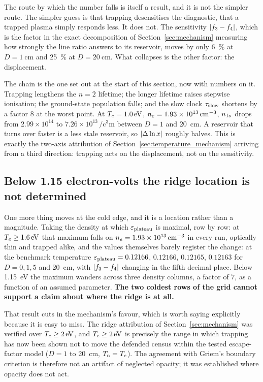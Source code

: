 The route by which the number falls is itself a result, and it is not the
simpler route. The simpler guess is that trapping desensitises the diagnostic,
that a trapped plasma simply responds less. It does not. The sensitivity
$|f_{3}-f_{4}|$, which is the factor in the exact decomposition of
Section~\ref{sec:mechanism} measuring how strongly the line ratio answers to its
reservoir, moves by only \SI{6}{\percent} at $D = \SI{1}{\centi\metre}$ and
\SI{25}{\percent} at $D = \SI{20}{\centi\metre}$. What collapses is the other
factor: the displacement.

The chain is the one set out at the start of this section, now with numbers on
it. Trapping lengthens the $n=2$ lifetime; the longer lifetime raises stepwise
ionisation; the ground-state population falls; and the slow clock $\tau_{\mathrm{slow}}$
shortens by a factor $8$ at the worst point. At $T_e = \SI{1.0}{\electronvolt}$,
$n_e = 1.93\times10^{13}\,\si{\per\cubic\centi\metre}$, $n_{1s}$ drops from
$2.99\times10^{14}$ to $7.26\times10^{13}\,\si{\per\cubic\centi\metre}$ between
$D = 1$ and \SI{20}{\centi\metre}. A reservoir that turns over faster is a less
stale reservoir, so $|\Delta\ln x|$ roughly halves. This is exactly the
two-axis attribution of Section~\ref{sec:temperature_mechanism} arriving from a
third direction: trapping acts on the displacement, not on the sensitivity.

\subsection{Below 1.15 electron-volts the ridge location is not determined}

One more thing moves at the cold edge, and it is a location rather than a
magnitude. Taking the density at which $\varepsilon_{\mathrm{plateau}}$ is maximal, row by row: at
$T_e \ge \SI{1.6}{\electronvolt}$ that maximum falls on
$n_e = 1.93\times10^{13}\,\si{\per\cubic\centi\metre}$ in every run, optically
thin and trapped alike, and the values themselves barely register the change:
at the benchmark temperature $\varepsilon_{\mathrm{plateau}} = 0.12166$, $0.12166$, $0.12165$,
$0.12163$ for $D = 0, 1, 5$ and \SI{20}{\centi\metre}, with
$|f_{3}-f_{4}|$ changing in the fifth decimal place. Below
\SI{1.15}{\electronvolt} the maximum wanders across three density columns, a
factor of $7$, as a function of an assumed parameter. \textbf{The two coldest
rows of the grid cannot support a claim about where the ridge is at all.}

That result cuts in the mechanism's favour, which is worth saying explicitly
because it is easy to miss. The ridge attribution of
Section~\ref{sec:mechanism} was verified over $T_e \ge \SI{2}{\electronvolt}$,
and $T_e \ge \SI{2}{\electronvolt}$ is precisely the range in which trapping has
now been shown not to move the defended census within the tested escape-factor
model ($D = 1$ to \SI{20}{\centi\metre}, $T_{\mathrm{n}} = T_e$). The agreement with
Griem's boundary criterion is therefore not an artifact of neglected opacity; it was established where
opacity does not act.


